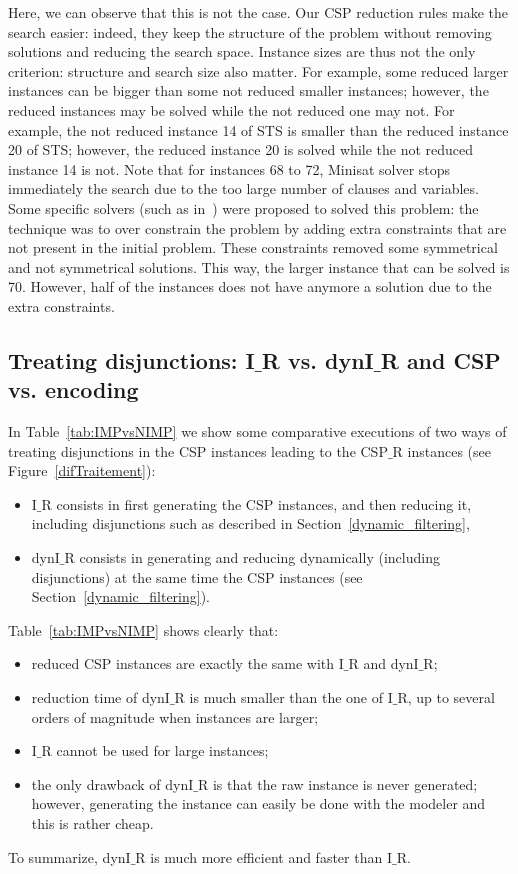 \documentclass[3p,authoryear,times]{elsarticle}
\begin{document}
Here, we can observe that this is not the case. Our CSP reduction rules make the search easier: indeed, they keep the structure of the problem without removing solutions and reducing the search space. Instance sizes are thus not the only criterion: structure and search size also matter. For example, some reduced larger instances can be bigger than some not reduced smaller instances; however, the reduced instances may be solved while the not reduced one may not. For example, the not reduced instance 14 of STS is smaller than the reduced instance 20 of STS; however, the reduced instance 20 is solved while the not reduced instance 14 is not. 
Note that for instances 68 to 72,  Minisat solver stops immediately the search due to the too large number of clauses and variables. 
Some specific solvers (such as in~\cite{hamiez14}) were proposed to solved this problem: the technique was to over constrain the problem by adding extra constraints that are not present in the initial problem. These constraints removed some symmetrical and not symmetrical solutions. This way, the larger  instance that can be solved is 70. However, half of the instances does not have anymore a solution due to the extra constraints. 



\subsection{Treating disjunctions: I$\_$R vs. dynI$\_$R and CSP vs. encoding}


In Table~\ref{tab:IMPvsNIMP} we show some comparative executions of two ways of treating disjunctions in the CSP instances leading to the CSP$\_$R instances (see Figure~\ref{difTraitement}): 
\begin{itemize}
\item I$\_$R consists in first generating the CSP instances, and then reducing it, including disjunctions such as described in Section~\ref{dynamic_filtering},
\item dynI$\_$R consists in generating and reducing dynamically (including disjunctions) at the same time the CSP instances (see Section~\ref{dynamic_filtering}).
\end{itemize}
Table~\ref{tab:IMPvsNIMP} shows clearly that:
\begin{itemize}
\item reduced CSP instances are exactly the same with I$\_$R and dynI$\_$R;
\item reduction time of dynI$\_$R is much smaller than the one of I$\_$R, up to several orders of magnitude when instances are larger;
\item I$\_$R cannot be used for large instances;
\item the only drawback of dynI$\_$R is that the raw instance is never generated; however, generating the instance can easily be done with the modeler and this is rather cheap.
\end{itemize}
To summarize, dynI$\_$R is much more efficient and faster than I$\_$R.
\end{document}
